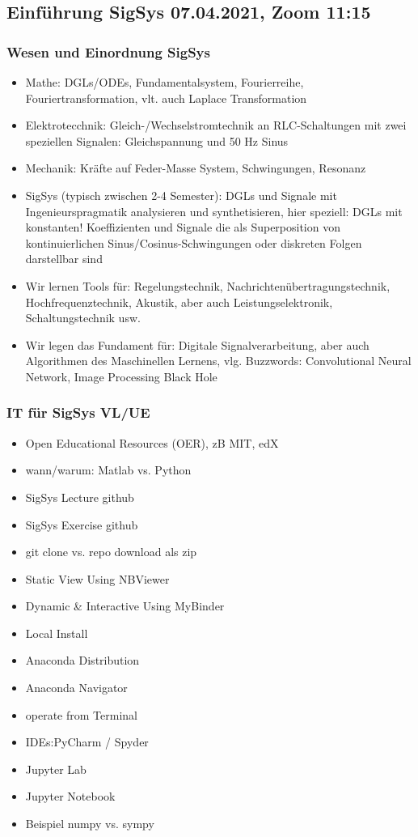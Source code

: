 \newpage
\subsection*{Einführung SigSys 07.04.2021, Zoom 11:15}

\subsubsection*{Wesen und Einordnung SigSys}
\begin{itemize}
\item Mathe: DGLs/ODEs, Fundamentalsystem, Fourierreihe, Fouriertransformation,
vlt. auch Laplace Transformation
\item Elektrotecchnik: Gleich-/Wechselstromtechnik an RLC-Schaltungen mit
zwei speziellen Signalen: Gleichspannung und 50 Hz Sinus
\item Mechanik: Kräfte auf Feder-Masse System, Schwingungen, Resonanz
\item SigSys (typisch zwischen 2-4 Semester): DGLs und Signale mit
Ingenieurspragmatik analysieren und synthetisieren, hier speziell: DGLs mit
konstanten! Koeffizienten und Signale die als Superposition von kontinuierlichen
Sinus/Cosinus-Schwingungen oder diskreten Folgen darstellbar sind
\item Wir lernen Tools für: Regelungstechnik, Nachrichtenübertragungstechnik,
Hochfrequenztechnik, Akustik, aber auch Leistungselektronik, Schaltungstechnik
usw.
\item Wir legen das Fundament für: Digitale Signalverarbeitung, aber auch
Algorithmen des Maschinellen Lernens, vlg. Buzzwords: Convolutional Neural Network,
Image Processing Black Hole
\end{itemize}

\subsubsection*{IT für SigSys VL/UE}
\begin{itemize}
\item Open Educational Resources (OER), zB MIT, edX
\item wann/warum: Matlab vs. Python
\item SigSys Lecture github
\item SigSys Exercise github
\item git clone vs. repo download als zip
\item Static View Using NBViewer
\item Dynamic \& Interactive Using MyBinder
\item Local Install
\item Anaconda Distribution
\item Anaconda Navigator
\item operate from Terminal
\item IDEs:PyCharm / Spyder
\item Jupyter Lab
\item Jupyter Notebook
\item Beispiel numpy vs. sympy
\end{itemize}
